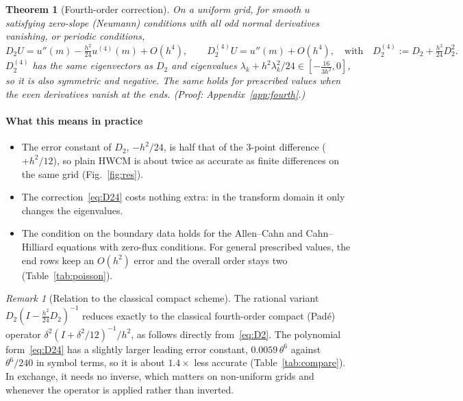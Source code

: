 \documentclass[preprint,12pt]{elsarticle}
\newtheorem{theorem}{Theorem}
\theoremstyle{remark}
\newtheorem{remark}{Remark}
\newcommand{\proofin}[1]{\hfill{\small\emph{(Proof: Appendix~\ref{#1}.)}}}
\begin{document}
\begin{theorem}[Fourth-order correction]\label{thm:fourth}
On a uniform grid, for smooth $u$ satisfying zero-slope (Neumann) conditions with all odd normal
derivatives vanishing, or periodic conditions,
\begin{equation}\label{eq:D24}
D_2U=u''(m)-\tfrac{h^2}{24}u^{(4)}(m)+O(h^4),\qquad
D_2^{(4)}U=u''(m)+O(h^4),\quad\text{with}\quad D_2^{(4)}:=D_2+\tfrac{h^2}{24}D_2^2 .
\end{equation}
$D_2^{(4)}$ has the same eigenvectors as $D_2$ and eigenvalues
$\lambda_k+h^2\lambda_k^2/24\in[-\tfrac{16}{3h^2},0]$, so it is also symmetric and negative.
The same holds for prescribed values when the even derivatives vanish at the ends.
\proofin{app:fourth}
\end{theorem}

\paragraph{What this means in practice}
\begin{itemize}
\item The error constant of $D_2$, $-h^2/24$, is half that of the 3-point difference ($+h^2/12$), so
plain HWCM is about twice as accurate as finite differences on the same grid (Fig.~\ref{fig:res}).
\item The correction~\eqref{eq:D24} costs nothing extra: in the transform domain it only changes the
eigenvalues.
\item The condition on the boundary data holds for the Allen--Cahn and Cahn--Hilliard equations with
zero-flux conditions. For general prescribed values, the end rows keep an $O(h^2)$ error and the
overall order stays two (Table~\ref{tab:poisson}).
\end{itemize}

\begin{remark}[Relation to the classical compact scheme]
The rational variant $D_2(I-\tfrac{h^2}{24}D_2)^{-1}$ reduces exactly to the classical fourth-order
compact (Pad\'e) operator $\delta^2(I+\delta^2/12)^{-1}/h^2$, as follows directly from~\eqref{eq:D2}.
The polynomial form~\eqref{eq:D24} has a slightly larger leading error constant, $0.0059\,\theta^6$
against $\theta^6/240$ in symbol terms, so it is about $1.4\times$ less accurate
(Table~\ref{tab:compare}). In exchange, it needs no inverse, which matters on non-uniform grids and
whenever the operator is applied rather than inverted.
\end{remark}
\end{document}
